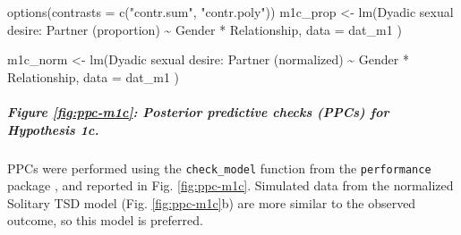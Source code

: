 \documentclass[
  bookmarksnumbered]{article}
\newenvironment{Shaded}{\begin{snugshade}}{\end{snugshade}}
\newcommand{\AttributeTok}[1]{\textcolor[rgb]{0.80,0.80,0.80}{#1}}
\newcommand{\FunctionTok}[1]{\textcolor[rgb]{0.94,0.94,0.56}{#1}}
\newcommand{\NormalTok}[1]{\textcolor[rgb]{0.80,0.80,0.80}{#1}}
\newcommand{\OtherTok}[1]{\textcolor[rgb]{0.94,0.94,0.56}{#1}}
\newcommand{\SpecialCharTok}[1]{\textcolor[rgb]{0.86,0.64,0.64}{#1}}
\newcommand{\StringTok}[1]{\textcolor[rgb]{0.80,0.58,0.58}{#1}}
\begin{document}
\begin{Shaded}
\begin{Highlighting}[]
\FunctionTok{options}\NormalTok{(}\AttributeTok{contrasts =} \FunctionTok{c}\NormalTok{(}\StringTok{"contr.sum"}\NormalTok{, }\StringTok{"contr.poly"}\NormalTok{))}
\NormalTok{m1c\_prop }\OtherTok{\textless{}{-}} \FunctionTok{lm}\NormalTok{(}\StringTok{\textasciigrave{}}\AttributeTok{Dyadic sexual desire: Partner (proportion)}\StringTok{\textasciigrave{}} \SpecialCharTok{\textasciitilde{}}\NormalTok{ Gender }\SpecialCharTok{*}\NormalTok{ Relationship,}
  \AttributeTok{data =}\NormalTok{ dat\_m1}
\NormalTok{)}

\NormalTok{m1c\_norm }\OtherTok{\textless{}{-}} \FunctionTok{lm}\NormalTok{(}\StringTok{\textasciigrave{}}\AttributeTok{Dyadic sexual desire: Partner (normalized)}\StringTok{\textasciigrave{}} \SpecialCharTok{\textasciitilde{}}\NormalTok{ Gender }\SpecialCharTok{*}\NormalTok{ Relationship,}
  \AttributeTok{data =}\NormalTok{ dat\_m1}
\NormalTok{)}
\end{Highlighting}
\end{Shaded}

\subparagraph{Figure \ref{fig:ppc-m1c}: Posterior predictive checks (PPCs) for Hypothesis 1c.}\label{figure-reffigppc-m1c-posterior-predictive-checks-ppcs-for-hypothesis-1c.}

PPCs were performed using the \texttt{check\_model} function from the \texttt{performance} package \autocite{ludecke2021}, and reported in Fig. \ref{fig:ppc-m1c}. Simulated data from the normalized Solitary TSD model (Fig. \ref{fig:ppc-m1c}b) are more similar to the observed outcome, so this model is preferred.
\end{document}
